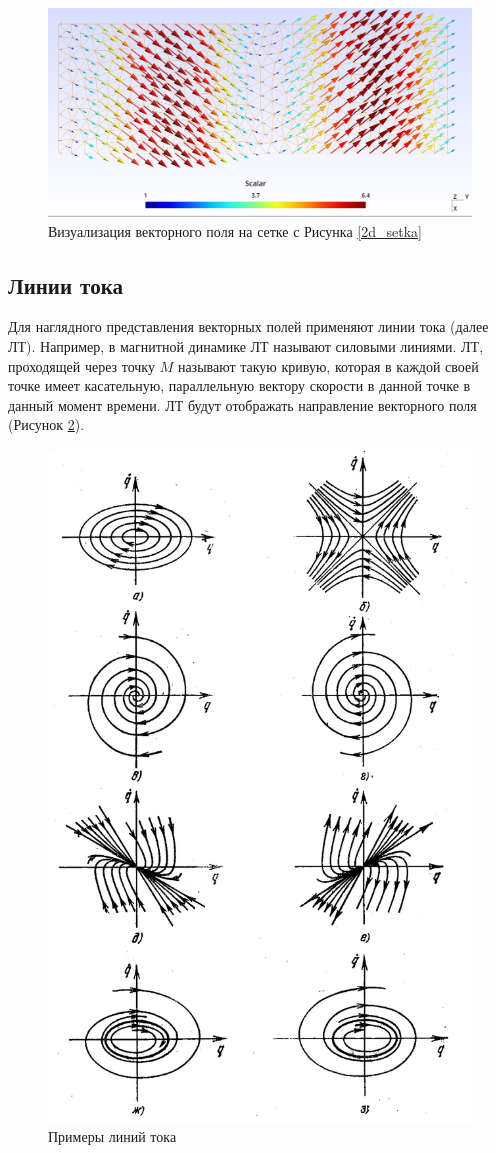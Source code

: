 \begin{figure}[H]
	\centering
	\includegraphics[width=\linewidth]{img/setka_with_vector_field}
	\caption{Визуализация векторного поля на сетке с Рисунка \ref{2d_setka}}
	\label{setka_with_vector_field}
\end{figure}

\subsection{Линии тока}
Для наглядного представления векторных полей применяют линии тока (далее ЛТ). Например, в магнитной динамике ЛТ называют силовыми линиями. ЛТ, проходящей через точку $M$ называют такую кривую, которая в каждой своей точке имеет касательную, параллельную вектору скорости в данной точке в данный момент времени. ЛТ будут отображать направление векторного поля (Рисунок \ref{cur_lines}).

\begin{figure}[H]
	\centering
	\includegraphics[width=.5\linewidth]{img/cur_lines}
	\caption{Примеры линий тока}
	\label{cur_lines}
\end{figure}

